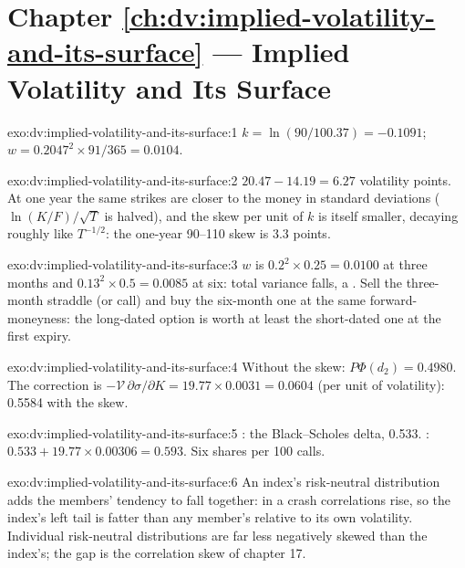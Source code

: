 \section*{Chapter \ref{ch:dv:implied-volatility-and-its-surface} --- Implied Volatility and Its Surface}

\begin{solution}{exo:dv:implied-volatility-and-its-surface:1}
$k=\ln(90/100.37)=-0.1091$; $w=0.2047^2\times91/365=0.0104$.
\end{solution}

\begin{solution}{exo:dv:implied-volatility-and-its-surface:2}
$20.47-14.19=6.27$ volatility points. At one year the same strikes are closer to the money in
standard deviations ($\ln(K/F)/\sqrt T$ is halved), and the skew per unit of $k$ is itself
smaller, decaying roughly like $T^{-1/2}$: the one-year 90--110 skew is 3.3 points.
\end{solution}

\begin{solution}{exo:dv:implied-volatility-and-its-surface:3}
$w$ is $0.2^2\times0.25=0.0100$ at three months and $0.13^2\times0.5=0.0085$ at six: total
variance falls, a . Sell the three-month straddle (or call) and buy the
six-month one at the same forward-moneyness: the long-dated option is worth at least the
short-dated one at the first expiry.
\end{solution}

\begin{solution}{exo:dv:implied-volatility-and-its-surface:4}
Without the skew: $P\Phi(d_2)=0.4980$. The correction is $-\mathcal V\,\partial\sigma/\partial K
=19.77\times0.0031=0.0604$ (per unit of volatility): 0.5584 with the skew.
\end{solution}

\begin{solution}{exo:dv:implied-volatility-and-its-surface:5}
: the Black--Scholes delta, 0.533. : $0.533+19.77\times0.00306=0.593$.
Six shares per 100 calls.
\end{solution}

\begin{solution}{exo:dv:implied-volatility-and-its-surface:6}
An index's risk-neutral distribution adds the members' tendency to fall together: in a crash
correlations rise, so the index's left tail is fatter than any member's relative to its own
volatility. Individual risk-neutral distributions are far less negatively skewed than the
index's; the gap is the correlation skew of chapter 17.
\end{solution}

